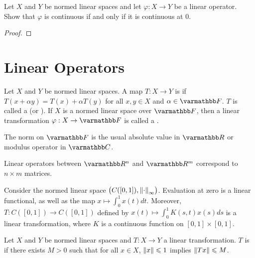 \begin{exercise}
Let $X$ and $Y$ be normed linear spaces and let $\varphi:X \rightarrow Y$ be a linear operator. Show that $\varphi$ is continuous if and only if it is continuous at 0.
\end{exercise}
    {\color{red} \begin{proof}
        
    \end{proof}}



\section{Linear Operators}

\begin{definition}
    Let $X$ and $Y$ be normed linear spaces. A map $T:X \rightarrow Y$ is  if $T(x + \alpha y) = T(x) + \alpha T(y)$ for all $x,y \in X$ and $\alpha \in \bfF$. $T$ is called a  (or ). If $X$ is a normed linear space over $\bfF$, then a linear transformation $\varphi:X \rightarrow \bfF$ is called a .
\end{definition}

\begin{remark}
    The norm on $\bfF$ is the usual absolute value in $\bfR$ or modulus operator in $\bfC$.
\end{remark}

\begin{example}
    Linear operators between $\bfR^n$ and $\bfR^m$ correspond to $n \times m$ matrices.
\end{example}

\begin{example}
    Consider the normed linear space $\bigl(C([0,1]), \left\lVert \cdot \right\rVert_\infty\bigr)$. Evaluation at zero is a linear functional, as well as the map $x \mapsto \int_0^1 x(t)dt$. Moreover, $T:C([0,1]) \rightarrow C([0,1])$ defined by $x(t) \mapsto \int_0^1 K(s,t)x(s)ds$ is a linear transformation, where $K$ is a continuous function on $[0,1] \times [0,1]$.
\end{example}

\begin{definition}
    Let $X$ and $Y$ be normed linear spaces and $T:X \rightarrow Y$ a linear transformation. $T$ is  if there exists $M > 0$ such that for all $x \in X$, $\left\lVert x \right\rVert \leqslant 1$ implies $\left\lVert Tx \right\rVert \leqslant M$.
\end{definition}


